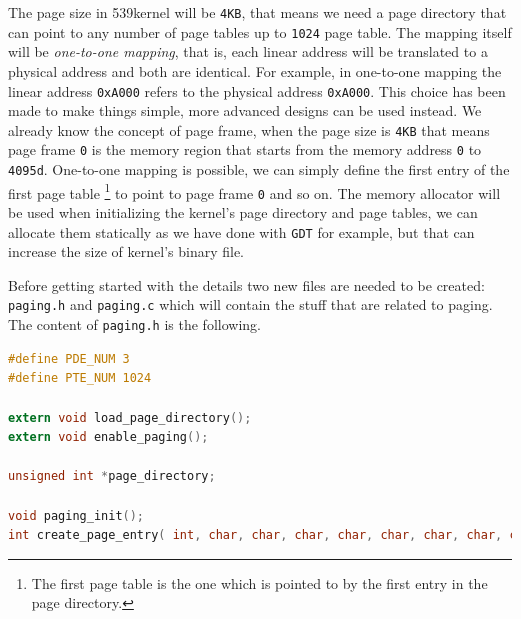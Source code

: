 The page size in 539kernel will be \lstinline!4KB!, that means we need a
page directory that can point to any number of page tables up to
\lstinline!1024! page table. The mapping itself will be \emph{one-to-one
mapping}, that is, each linear address will be translated to a physical
address and both are identical. For example, in one-to-one mapping the
linear address \lstinline!0xA000! refers to the physical address
\lstinline!0xA000!. This choice has been made to make things simple,
more advanced designs can be used instead. We already know the concept
of page frame, when the page size is \lstinline!4KB! that means page
frame \lstinline!0! is the memory region that starts from the memory
address \lstinline!0! to \lstinline!4095d!. One-to-one mapping is
possible, we can simply define the first entry of the first page table
\footnote{The first page table is the one which is pointed to by the
  first entry in the page directory.} to point to page frame
\lstinline!0! and so on. The memory allocator will be used when
initializing the kernel's page directory and page tables, we can
allocate them statically as we have done with \lstinline!GDT! for
example, but that can increase the size of kernel's binary file.

Before getting started with the details two new files are needed to be
created: \lstinline!paging.h! and \lstinline!paging.c! which will
contain the stuff that are related to paging. The content of
\lstinline!paging.h! is the following.

\begin{lstlisting}[language=C]
#define PDE_NUM 3
#define PTE_NUM 1024

extern void load_page_directory();
extern void enable_paging();

unsigned int *page_directory;

void paging_init();
int create_page_entry( int, char, char, char, char, char, char, char, char );
\end{lstlisting}

